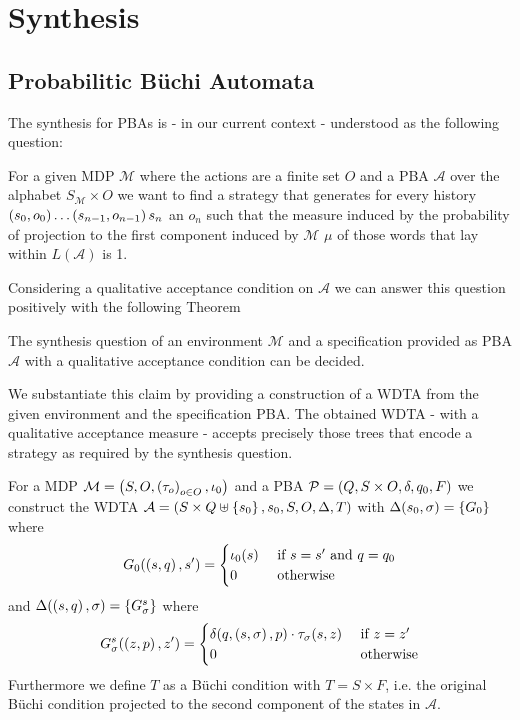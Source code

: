 \chapter{Synthesis}
\section{Probabilitic Büchi Automata}
The synthesis for \acp{PBA} is - in our current context - understood as the
following question:
\begin{definition}
  For a given \ac{MDP} $\mathcal{M}$ where the actions are a finite set $O$ and
  a \ac{PBA} $\mathcal{A}$ over the alphabet $S_{\mathcal{M}}\times O$ we want
  to find a strategy that generates for every history
  $\left(s_{0}, o_{0}\right)\dots\left(s_{n-1},o_{n-1}\right)s_{n}$ an
  $o_{n}$ such that the measure induced by the probability of projection to the
  first component induced by $\mathcal{M}$ $\mu$ of those words that lay within
  $L(\mathcal{A})$ is 1.
\end{definition}
Considering a qualitative acceptance condition on $\mathcal{A}$ we can answer
this question positively with the following Theorem
\begin{theorem}
  The synthesis question of an environment $\mathcal{M}$ and a specification
  provided as \ac{PBA} $\mathcal{A}$ with a qualitative acceptance condition
  can be decided.
\end{theorem}
We substantiate this claim by providing a construction of a \ac{WDTA} from the
given environment and the specification \ac{PBA}. The obtained \ac{WDTA} - with
a qualitative acceptance measure - accepts precisely those trees that encode a
strategy as required by the synthesis question.
\begin{definition}
  For a \ac{MDP} $\mathcal{M} = \left(S, O, \left(\tau_{o}\right)_{o\in O},
  \iota_{0}\right)$ and a \ac{PBA} $\mathcal{P} = \left(Q, S\times O, \delta, q_{0},
  F\right)$ we construct the \ac{WDTA}
  $\mathcal{A} = \left(S\times Q\uplus\left\{s_{0}\right\}, s_{0}, S, O, \Delta,
  T\right)$ with $\Delta(s_{0}, \sigma) = \left\{G_{0}\right\}$ where
  \begin{equation*}
    G_{0}(\left(s,q\right), s') =
    \begin{cases}
      \iota_{0}(s)&\text{ if }s = s'\text{ and }q = q_{0}\\
      0 &\text{ otherwise}
    \end{cases}
  \end{equation*}
  and $\Delta(\left(s, q\right), \sigma) = \left\{G^{s}_{\sigma}\right\}$ where
  \begin{equation*}
    G^{s}_{\sigma}(\left(z,p\right), z') =
    \begin{cases}
      \delta(q, \left(s,\sigma\right), p)\cdot\tau_{\sigma}(s,z)&\text{ if }z = z'\\
      0 &\text{ otherwise}
    \end{cases}
  \end{equation*}
  Furthermore we define $T$ as a Büchi condition with $T = S\times F$, i.e. the
  original Büchi condition projected to the second component of the
  states in $\mathcal{A}$.
\end{definition}

